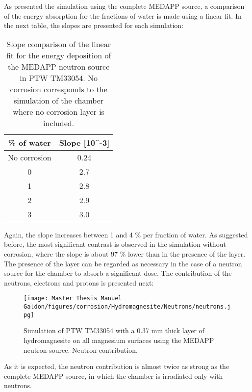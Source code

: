 As presented the simulation using the complete MEDAPP source, a comparison of the energy absorption for the fractions of water is made using a linear fit. In the next table, the slopes are presented for each simulation: 

\begin{table}[!h]
\centering
\begin{tabular}{|c|c|}
\hline
\rowcolor[HTML]{A9D9C6} 
\% of water & Slope [10^{-3}]\\ \hline
No corrosion           & 0.24\\ \hline
0           & 2.7                                \\ \hline
1           & 2.8                               \\ \hline
2           & 2.9                               \\ \hline
3           & 3.0                               \\ \hline
\end{tabular}
\caption{Slope comparison of the linear fit for the energy deposition of the MEDAPP neutron source in PTW TM33054. No corrosion corresponds to the simulation of the chamber where no corrosion layer is included.}
\label{table: Slope comparison for MEDAPP source at the energy deposition. Neutrons}
\end{table}

Again, the slope increases between 1 and 4 $\%$ per fraction of water. As suggested before, the most significant contrast is observed in the simulation without corrosion, where the slope is about 97 $\%$ lower than in the presence of the layer. The presence of the layer can be regarded as necessary in the case of a neutron source for the chamber to absorb a significant dose.
The contribution of the neutrons, electrons and protons is presented next:

\begin{figure}[!h]
  \centering
    \centerline{\texttt{[image: Master Thesis Manuel Galdon/figures/corrosion/Hydromagnesite/Neutrons/neutrons.jpg]}}
  \caption{Simulation of PTW TM33054 with a 0.37 \unit{\milli\meter} thick layer of hydromagnesite on all magnesium surfaces using the MEDAPP neutron source. Neutron contribution.}
  \label{fig:IC3305 with hydromagnesite, MEDAPP, neutron contribution. Neutron source}
\end{figure}
As it is expected, the neutron contribution is almost twice as strong as the complete MEDAPP source, in which the chamber is irradiated only with neutrons. 

